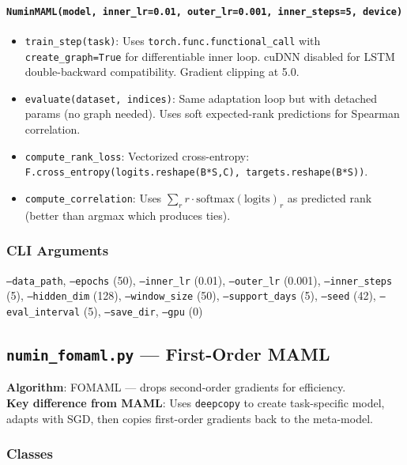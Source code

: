 \documentclass[11pt,a4paper]{article}
\begin{document}
\paragraph{\texttt{NuminMAML(model, inner\_lr=0.01, outer\_lr=0.001, inner\_steps=5, device)}}
\begin{itemize}[nosep]
  \item \texttt{train\_step(task)}: Uses \texttt{torch.func.functional\_call} with \texttt{create\_graph=True} for differentiable inner loop. cuDNN disabled for LSTM double-backward compatibility. Gradient clipping at 5.0.
  \item \texttt{evaluate(dataset, indices)}: Same adaptation loop but with detached params (no graph needed). Uses soft expected-rank predictions for Spearman correlation.
  \item \texttt{compute\_rank\_loss}: Vectorized cross-entropy: \texttt{F.cross\_entropy(logits.reshape(B*S,C), targets.reshape(B*S))}.
  \item \texttt{compute\_correlation}: Uses $\sum_r r \cdot \text{softmax}(\text{logits})_r$ as predicted rank (better than argmax which produces ties).
\end{itemize}

\subsubsection{CLI Arguments}
\texttt{--data\_path}, \texttt{--epochs} (50), \texttt{--inner\_lr} (0.01), \texttt{--outer\_lr} (0.001), \texttt{--inner\_steps} (5), \texttt{--hidden\_dim} (128), \texttt{--window\_size} (50), \texttt{--support\_days} (5), \texttt{--seed} (42), \texttt{--eval\_interval} (5), \texttt{--save\_dir}, \texttt{--gpu} (0)

\subsection{\texttt{numin\_fomaml.py} --- First-Order MAML}
\textbf{Algorithm}: FOMAML --- drops second-order gradients for efficiency.\\
\textbf{Key difference from MAML}: Uses \texttt{deepcopy} to create task-specific model, adapts with SGD, then copies first-order gradients back to the meta-model.

\subsubsection{Classes}
\end{document}
